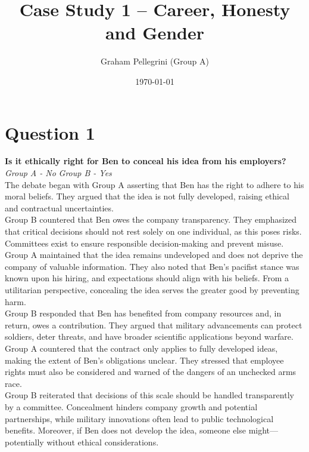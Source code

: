 \documentclass[12pt]{article}
\title{Case Study 1 – Career, Honesty and Gender}
\author{Graham Pellegrini (Group A)}
\date{\today}
\begin{document}
\maketitle

\section{Question 1}
\textbf{Is it ethically right for Ben to conceal his idea from his employers?}\\

\textit{Group A - No}  
\textit{Group B - Yes}\\

The debate began with Group A asserting that Ben has the right to adhere to his moral beliefs. They argued that the idea is not fully developed, raising ethical and contractual uncertainties.\\

Group B countered that Ben owes the company transparency. They emphasized that critical decisions should not rest solely on one individual, as this poses risks. Committees exist to ensure responsible decision-making and prevent misuse.\\

Group A maintained that the idea remains undeveloped and does not deprive the company of valuable information. They also noted that Ben’s pacifist stance was known upon his hiring, and expectations should align with his beliefs. From a utilitarian perspective, concealing the idea serves the greater good by preventing harm.\\

Group B responded that Ben has benefited from company resources and, in return, owes a contribution. They argued that military advancements can protect soldiers, deter threats, and have broader scientific applications beyond warfare.\\

Group A countered that the contract only applies to fully developed ideas, making the extent of Ben’s obligations unclear. They stressed that employee rights must also be considered and warned of the dangers of an unchecked arms race.\\

Group B reiterated that decisions of this scale should be handled transparently by a committee. Concealment hinders company growth and potential partnerships, while military innovations often lead to public technological benefits. Moreover, if Ben does not develop the idea, someone else might—potentially without ethical considerations.\\
\end{document}
